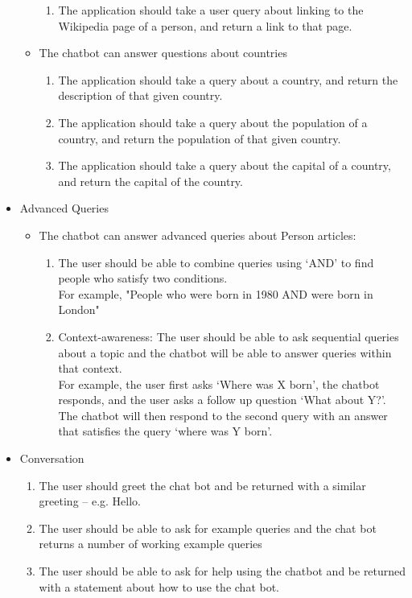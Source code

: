 \begin{itemize}
\begin{itemize}
\begin{enumerate}[resume*]
			\item The application should take a user query about linking to the Wikipedia page of a person, and return a link to that page.
		\end{enumerate}
		\item The chatbot can answer questions about countries
		\begin{enumerate}[resume*]
			\item The application should take a query about a country, and return the description of that given country.
			\item The application should take a query about the population of a country, and return the population of that given country.
			\item The application should take a query about the capital of a country, and return the capital of the country.
			
		\end{enumerate}
	\end{itemize}
	\item Advanced Queries
	\begin{itemize}
		\item The chatbot can answer advanced queries about Person articles:
		\begin{enumerate}[resume*]
			\item The user should be able to combine queries using ‘AND’ to find people who satisfy two conditions. \\For example, "People who were born in 1980 AND were born in London"
			\item Context-awareness: The user should be able to ask sequential queries about a topic and the chatbot will be able to answer queries within that context. \\ For example, the user first asks ‘Where was X born’, the chatbot responds, and the user asks a follow up question ‘What about Y?’. The chatbot will then respond to the second query with an answer that satisfies the query ‘where was Y born’.
		\end{enumerate}
	\end{itemize}
	\item Conversation
	\begin{enumerate}[resume*]
		\item The user should greet the chat bot and be returned with a similar greeting – e.g. Hello.
		\item The user should be able to ask for example queries and the chat bot returns a number of working example queries
		\item The user should be able to ask for help using the chatbot and be returned with a statement about how to use the chat bot.
	\end{enumerate}
\end{itemize}

